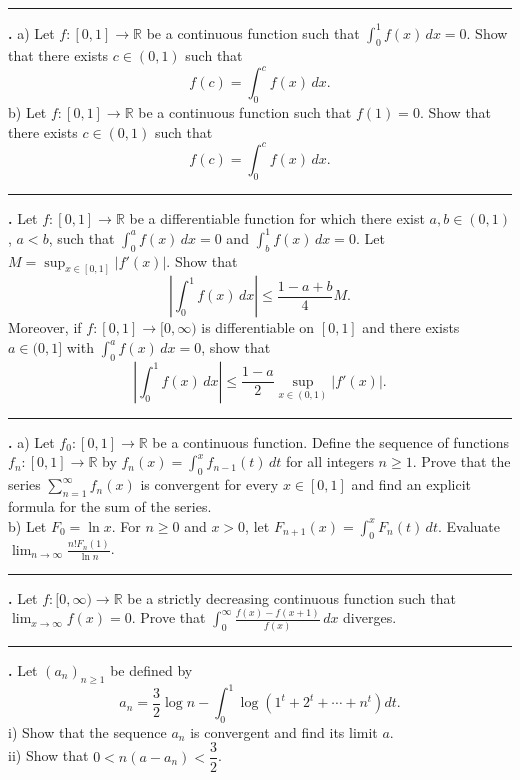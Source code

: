 \documentclass[11pt]{article}
\newcounter{probnum}
\newenvironment{problembox}{\par\noindent\rule{\linewidth}{0.5pt}\vspace{5pt}\par}{\vspace{2pt}}
\begin{document}
\begin{problembox}
\textbf{\theprobnum.} a) Let $f : [0,1] \to \mathbb{R}$ be a continuous function such that $\displaystyle\int_0^1 f(x)\,dx = 0$. Show that there exists $c \in (0,1)$ such that
\[
f(c) = \int_0^c f(x)\,dx.
\]
b) Let $f : [0,1] \to \mathbb{R}$ be a continuous function such that $f(1) = 0$. Show that there exists $c \in (0,1)$ such that
\[
f(c) = \int_0^c f(x)\,dx.
\]
\end{problembox}

\begin{problembox}
\textbf{\theprobnum.} Let $f : [0,1] \to \mathbb{R}$ be a differentiable function for which there exist $a, b \in (0,1)$, $a < b$, such that $\displaystyle\int_0^a f(x)\,dx = 0$ and $\displaystyle\int_b^1 f(x)\,dx = 0$. Let $M = \displaystyle\sup_{x \in [0,1]} |f'(x)|$. Show that
\[
\left|\int_0^1 f(x)\,dx\right| \le \frac{1-a+b}{4} M.
\]
Moreover, if $f : [0,1] \to [0,\infty)$ is differentiable on $[0,1]$ and there exists $a \in (0,1]$ with $\displaystyle\int_0^a f(x)\,dx = 0$, show that
\[
\left|\int_0^1 f(x)\,dx\right| \le \frac{1-a}{2} \sup_{x \in (0,1)} |f'(x)|.
\]
\end{problembox}

\begin{problembox}
\textbf{\theprobnum.} a) Let $f_0 : [0,1] \to \mathbb{R}$ be a continuous function. Define the sequence of functions $f_n : [0,1] \to \mathbb{R}$ by $f_n(x) = \displaystyle\int_0^x f_{n-1}(t)\,dt$ for all integers $n \ge 1$. Prove that the series $\displaystyle\sum_{n=1}^{\infty} f_n(x)$ is convergent for every $x \in [0,1]$ and find an explicit formula for the sum of the series.\\
b) Let $F_0 = \ln x$. For $n \ge 0$ and $x > 0$, let $F_{n+1}(x) = \displaystyle\int_0^x F_n(t)\,dt$. Evaluate $\displaystyle\lim_{n \to \infty} \frac{n! F_n(1)}{\ln n}$.
\end{problembox}

\begin{problembox}
\textbf{\theprobnum.} Let $f : [0,\infty) \to \mathbb{R}$ be a strictly decreasing continuous function such that $\displaystyle\lim_{x \to \infty} f(x) = 0$. Prove that $\displaystyle\int_0^{\infty} \frac{f(x)-f(x+1)}{f(x)}\,dx$ diverges.
\end{problembox}

\begin{problembox}
\textbf{\theprobnum.} Let $(a_n)_{n \ge 1}$ be defined by
\[
a_n = \frac{3}{2} \log n - \int_0^1 \log\left(1^t + 2^t + \cdots + n^t\right) dt.
\]
i) Show that the sequence $a_n$ is convergent and find its limit $a$.\\
ii) Show that $0 < n(a-a_n) < \dfrac{3}{2}$.
\end{problembox}
\end{document}
